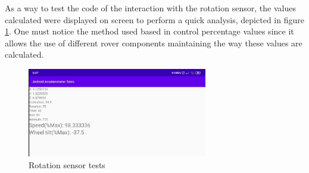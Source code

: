%
As a way to test the code of the interaction with the rotation sensor, the values calculated were displayed on screen to perform a quick analysis, depicted in figure \ref{fig:rot-sens-test}. One must notice the method used based in control percentage values since it allows the use of different rover components maintaining the way these values are calculated.
%
\begin{figure}[!ht]
\centering
\includegraphics[width=0.7\textwidth]{img/rot-sensor-tests.png}
\caption{\label{fig:rot-sens-test}Rotation sensor tests}
\end{figure}
%